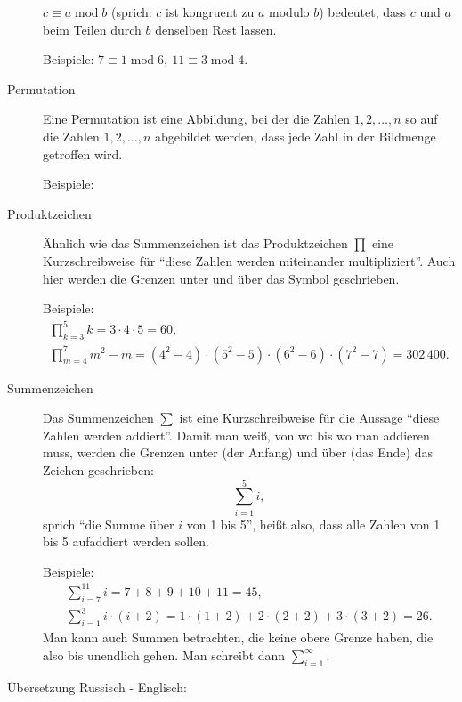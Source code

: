 \begin{description}
		$c\equiv a \operatorname{mod} b$ (sprich: $c$ ist kongruent zu $a$ modulo $b$) bedeutet, dass $c$ und $a$ beim Teilen durch $b$ denselben Rest lassen. 

		Beispiele: $7\equiv 1\operatorname{mod} 6,\ 11\equiv 3\operatorname{mod} 4$.
	\item[Permutation] Eine Permutation ist eine Abbildung, bei der die Zahlen $1,2,\dots,n$ so auf die Zahlen $1,2,\dots,n$ abgebildet werden, dass jede Zahl in der Bildmenge getroffen wird. 

		Beispiele:
		\begin{figure}[H] 
			\centering 
			\def\svgwidth{200pt} 
			 
		\end{figure} 
	\item[Produktzeichen] Ähnlich wie das Summenzeichen ist das Produktzeichen $\prod$ eine Kurzschreibweise für \enquote{diese Zahlen werden miteinander multipliziert}. Auch hier werden die Grenzen unter und über das Symbol geschrieben. 

		Beispiele: 
		\begin{gather*}
			\prod\limits_{k=3}^5 k = 3\cdot 4\cdot 5 = 60,\\
			\prod\limits_{m=4}^7 m^2 - m = (4^2-4)\cdot(5^2-5)\cdot (6^2-6) \cdot (7^2-7)= 302\,400.
		\end{gather*}
	\item[Summenzeichen] Das Summenzeichen $\sum$ ist eine Kurzschreibweise für die Aussage \enquote{diese Zahlen werden addiert}. 
		Damit man weiß, von wo bis wo man addieren muss, werden die Grenzen unter (der Anfang) und über (das Ende) das Zeichen geschrieben:
		\begin{equation*}
			\sum\limits_{i=1}^5 i,
		\end{equation*}
		sprich \enquote{die Summe über $i$ von 1 bis 5}, heißt also, dass alle Zahlen von 1 bis 5 aufaddiert werden sollen. 

		Beispiele:
		\begin{gather*}
			\sum\limits_{i=7}^{11} i= 7+8+9+10+11 = 45,\\
			\sum\limits_{i=1}^3 i\cdot (i+2) = 1\cdot (1+2) + 2\cdot (2+2) + 3\cdot (3+2) = 26.
		\end{gather*}
		Man kann auch Summen betrachten, die keine obere Grenze haben, die also bis unendlich gehen. Man schreibt dann $\sum\limits_{i=1}^\infty$. 
\end{description}
\clearpage
\null\vfill
\noindent
Übersetzung Russisch - Englisch:\\
